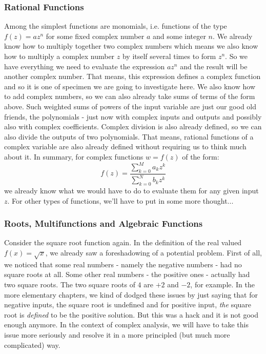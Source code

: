 \subsubsection{Rational Functions}
Among the simplest functions are monomials, i.e. functions of the type $f(z) = a z^n$ for some fixed complex number $a$ and some integer $n$. We already know how to multiply together two complex numbers which means we also know how to multiply a complex number $z$ by itself several times to form $z^n$. So we have everything we need to evaluate the expression $a z^n$ and the result will be another complex number. That means, this expression defines a complex function and so it is one of specimen we are going to investigate here. We also know how to add complex numbers, so we can also already take sums of terms of the form above. Such weighted sums of powers of the input variable are just our good old friends, the polynomials - just now with complex inputs and outputs and possibly also with complex coefficients. Complex division is also already defined, so we can also divide the outputs of two polynomials. That means, rational functions of a complex variable are also already defined without requiring us to think much about it. In summary, for complex functions $w = f(z)$ of the form:
\begin{equation}
f(z) = \frac{\sum_{k=0}^{M} a_k z^k}{\sum_{k=0}^{N} b_k z^k}
\end{equation}
we already know what we would have to do to evaluate them for any given input $z$. For other types of functions, we'll have to put in some more thought...




\subsubsection{Roots, Multifunctions and Algebraic Functions}
Consider the square root function again. In the definition of the real valued $f(x) = \sqrt{x}$, we already saw a foreshadowing of a potential problem. First of all, we noticed that some real numbers - namely the negative numbers - had no square roots at all. Some other real numbers - the positive ones - actually had two square roots. The two square roots of $4$ are $+2$ and $-2$, for example. In the more elementary chapters, we kind of dodged these issues by just saying that for negative inputs, the square root is undefined and for positive input, \emph{the} square root is \emph{defined} to be the positive solution. But this was a hack and it is not good enough anymore. In the context of complex analysis, we will have to take this issue more seriously and resolve it in a more principled (but much more complicated) way.

